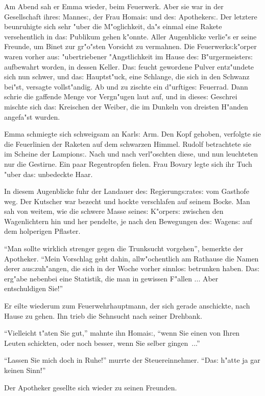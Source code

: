 \documentclass[oneside,12pt]{book}
\newcommand{\s}{s:}%
\begin{document}
Am Abend sah er Emma wieder, beim Feuerwerk. Aber sie war in der
Gesellschaft ihre{\s} Manne{\s}, der Frau Homai{\s} und de{\s}
Apotheker{\s}. Der letztere beunruhigte sich sehr "uber die
M"oglichkeit, da"s einmal eine Rakete versehentlich in da{\s}
Publikum gehen k"onnte. Aller Augenblicke verlie"s er seine
Freunde, um Binet zur gr"o"sten Vorsicht zu vermahnen. Die
Feuerwerk{\s}k"orper waren vorher au{\s} "ubertriebener
"Angstlichkeit im Hause de{\s} B"urgermeister{\s} aufbewahrt
worden, in dessen Keller. Da{\s} feucht gewordene Pulver
ent\/z"undete sich nun schwer, und da{\s} Hauptst"uck, eine
Schlange, die sich in den Schwanz bei"st, versagte vollst"andig.
Ab und zu zischte ein d"urftige{\s} Feuerrad. Dann schrie die
gaffende Menge vor Vergn"ugen laut auf, und in diese{\s} Geschrei
mischte sich da{\s} Kreischen der Weiber, die im Dunkeln von
dreisten H"anden angefa"st wurden.

Emma schmiegte sich schweigsam an Karl{\s} Arm. Den Kopf gehoben,
verfolgte sie die Feuerlinien der Raketen auf dem schwarzen
Himmel. Rudolf betrachtete sie im Scheine der Lampion{\s}. Nach
und nach verl"oschten diese, und nun leuchteten nur die Gestirne.
Ein paar Regentropfen fielen. Frau Bovary legte sich ihr Tuch
"uber da{\s} unbedeckte Haar.

In diesem Augenblicke fuhr der Landauer de{\s} Regierung{\s}rate{\s}
vom Gasthofe weg. Der Kutscher war bezecht und hockte verschlafen
auf seinem Bocke. Man sah von weitem, wie die schwere Masse
seine{\s} K"orper{\s} zwischen den Wagenlichtern hin und her
pendelte, je nach den Bewegungen de{\s} Wagen{\s} auf dem
holperigen Pflaster.

"`Man sollte wirklich strenger gegen die Trunksucht vorgehen"',
bemerkte der Apotheker. "`Mein Vorschlag geht dahin, allw"ochentlich
am Rathause die Namen derer au{\s}zuh"angen, die sich in der Woche
vorher sinnlo{\s} betrunken haben. Da{\s} erg"abe nebenbei eine
Statistik, die man in gewissen F"allen ... Aber entschuldigen
Sie!"'

Er eilte wiederum zum Feuerwehrhauptmann, der sich gerade
anschickte, nach Hause zu gehen. Ihn trieb die Sehnsucht nach
seiner Drehbank.

"`Vielleicht t"aten Sie gut,"' mahnte ihn Homai{\s}, "`wenn Sie
einen von Ihren Leuten schickten, oder noch besser, wenn Sie
selber gingen~..."'

"`Lassen Sie mich doch in Ruhe!"' murrte der Steuereinnehmer.
"`Da{\s} h"atte ja gar keinen Sinn!"'

Der Apotheker gesellte sich wieder zu seinen Freunden.
\end{document}
